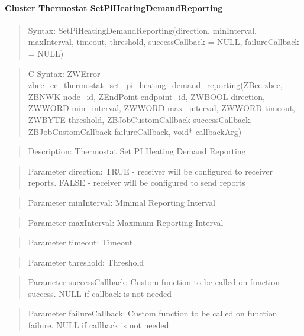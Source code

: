 \paragraph{Cluster Thermostat SetPiHeatingDemandReporting}
\begin{quote}Syntax: SetPiHeatingDemandReporting(direction, minInterval, maxInterval, timeout, threshold, successCallback = NULL, failureCallback = NULL)\end{quote}
\begin{quote}C Syntax: ZWError zbee\_cc\_thermostat\_set\_pi\_heating\_demand\_reporting(ZBee zbee, ZBNWK node\_id, ZEndPoint endpoint\_id, ZWBOOL direction, ZWWORD min\_interval, ZWWORD max\_interval, ZWWORD timeout, ZWBYTE threshold, ZBJobCustomCallback successCallback, ZBJobCustomCallback failureCallback, void* callbackArg)\end{quote}
\begin{quote}Description: Thermostat Set PI Heating Demand Reporting\end{quote}
\begin{quote}Parameter direction: TRUE  - receiver will be configured to receiver reports. FALSE - receiver will be configured to send reports\end{quote}
\begin{quote}Parameter minInterval: Minimal Reporting Interval\end{quote}
\begin{quote}Parameter maxInterval: Maximum Reporting Interval\end{quote}
\begin{quote}Parameter timeout: Timeout\end{quote}
\begin{quote}Parameter threshold: Threshold\end{quote}
\begin{quote}Parameter successCallback: Custom function to be called on function success. NULL if callback is not needed\end{quote}
\begin{quote}Parameter failureCallback: Custom function to be called on function failure. NULL if callback is not needed\end{quote}


